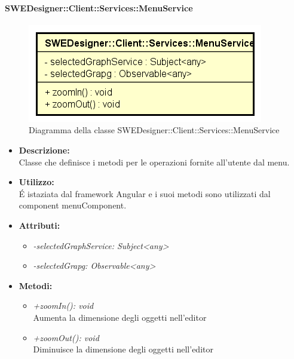 			\paragraph{SWEDesigner::Client::Services::MenuService}
			\begin{figure}[h!]
			\centering
			\includegraphics[scale=0.8]{Classi/SWEDesigner__Client__Services__MenuService.png}
			\caption{Diagramma della classe SWEDesigner::Client::Services::MenuService}
 			\end{figure}
				\begin{itemize}
          			\item \textbf{Descrizione:}\\
          			Classe che definisce i metodi per le operazioni fornite all’utente dal menu.
          			\item \textbf{Utilizzo:}\\
          			É istaziata dal framework Angular e i suoi metodi sono utilizzati dal component menuComponent.
          			\item \textbf{Attributi:}\\
          			\begin{itemize}
          				\item \emph{-selectedGraphService: Subject<any>}\\
          				\item \emph{-selectedGrapg: Observable<any>}\\
          			\end{itemize}
          			\item \textbf{Metodi:}\\
          			\begin{itemize}
          				\item \emph{+zoomIn(): void}\\
          				Aumenta la dimensione degli oggetti nell'editor
          				\item \emph{+zoomOut(): void}\\
          				Diminuisce la dimensione degli oggetti nell'editor
          			\end{itemize}
          		\end{itemize}

